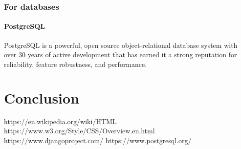 \documentclass[12pt,a4paper]{article}
\begin{document}
	\subsubsection{For databases}
	\paragraph{PostgreSQL}
	PostgreSQL is a powerful, open source object-relational database system with over 30 years of active development that has earned it a strong reputation for reliability, feature robustness, and performance.\cite{PostgreSQL}
	\clearpage
	\section{Conclusion}
	
	\clearpage
	\begin{thebibliography}{9}
		https://en.wikipedia.org/wiki/HTML
		https://www.w3.org/Style/CSS/Overview.en.html
		https://www.djangoproject.com/
		https://www.postgresql.org/
	\end{thebibliography}
	
\end{document}
